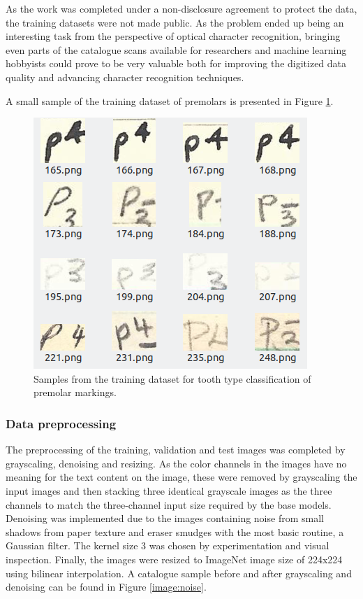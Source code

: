 \documentclass{article}
\begin{document}
As the work was completed under a non-disclosure agreement to protect the data, the training datasets were not 
made public. As the problem ended up being an interesting task from the perspective of optical character recognition, 
bringing even parts of the catalogue scans available for researchers and machine learning hobbyists could prove to be 
very valuable both for improving the digitized data quality and advancing character recognition techniques.
 
A small sample of the training dataset of premolars is presented in Figure \ref{image:samples}.

\begin{figure}[h]
    \centering
    \includegraphics*[scale=.5]{../images/trainingsamples.png}
    \caption{Samples from the training dataset for tooth type classification of premolar markings.}
    \label{image:samples}
\end{figure}

\subsubsection{Data preprocessing}
 
The preprocessing of the training, validation and test images was completed by grayscaling, denoising and resizing.
As the color channels in the images have no meaning for the text content on the image, these were removed 
by grayscaling the input images and then stacking three identical grayscale images as the three channels 
to match the three-channel input size required by the base models.
Denoising was implemented due to the images containing noise from small shadows from 
paper texture and eraser smudges with the most basic routine, a Gaussian filter.
The kernel size 3 was chosen by experimentation and visual inspection. Finally, the images were resized to 
ImageNet image size of 224x224 using bilinear interpolation. A catalogue sample before and after grayscaling and denoising can 
be found in Figure \ref{image:noise}.
\end{document}
